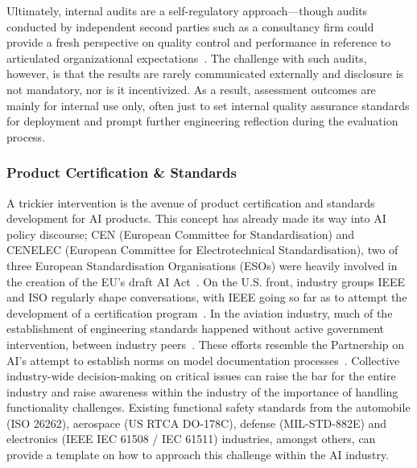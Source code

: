 \documentclass[acmconf,manuscript,screen,natbib=true]{acmart}
\begin{document}

Ultimately, internal audits are a self-regulatory approach---though audits conducted by independent second parties such as a consultancy firm could provide a fresh perspective on quality control and performance in reference to articulated organizational expectations~\cite{UNESCO}. The challenge with such audits, however, is that the results are rarely communicated externally and disclosure is not mandatory, nor is it incentivized. As a result, assessment outcomes are mainly for internal use only, often just to set internal quality assurance standards for deployment and prompt further engineering reflection during the evaluation process. 

\subsubsection{Product Certification \& Standards}

A trickier intervention is the avenue of product certification and standards development for AI products. 
This concept has already made its way into AI policy discourse; CEN (European Committee for Standardisation) and CENELEC (European Committee for Electrotechnical Standardisation), two of three European Standardisation Organisations (ESOs) were heavily involved in the creation of the EU's draft AI Act~\cite{veale_euact}. On the U.S. front, industry groups IEEE and ISO regularly shape conversations, with IEEE going so far as to attempt the development of a certification program~\cite{ieee_cert, havens2019principles}. 
In the aviation industry, much of the establishment of engineering standards happened without active government intervention, between industry peers~\cite{raji2020closing}. These efforts resemble the Partnership on AI’s attempt to establish norms on model documentation processes~\cite{raji2019ml}. Collective industry-wide decision-making on critical issues can raise the bar for the entire industry and raise awareness within the industry of the importance of handling functionality challenges. 
Existing functional safety standards from the automobile (ISO 26262), aerospace (US RTCA DO-178C), defense (MIL-STD-882E) and electronics (IEEE IEC 61508 / IEC 61511) industries, amongst others, can provide a template on how to approach this challenge within the AI industry. 
\end{document}
